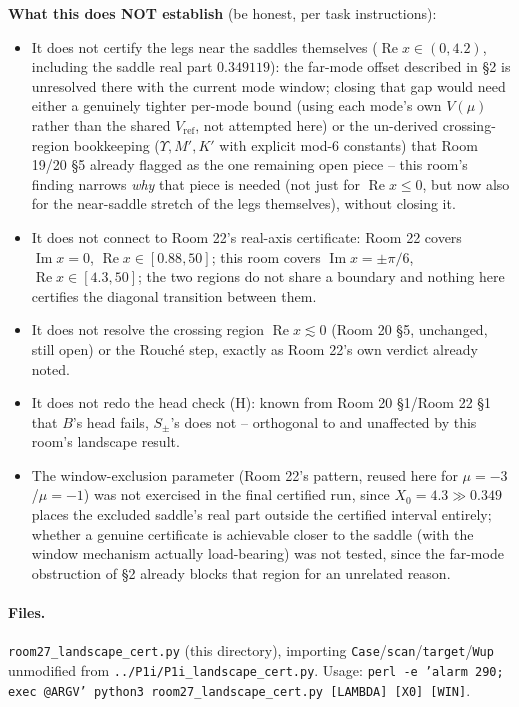 \documentclass[11pt]{article}
\begin{document}
\textbf{What this does NOT establish} (be honest, per task instructions):
\begin{itemize}
\item It does not certify the legs near the saddles themselves ($\operatorname{Re}x\in(0,4.2)$, including
the saddle real part $0.349119$): the far-mode offset described in \S2 is unresolved there with the
current mode window; closing that gap would need either a genuinely tighter per-mode bound (using each
mode's own $V(\mu)$ rather than the shared $V_{\mathrm{ref}}$, not attempted here) or the un-derived
crossing-region bookkeeping ($\Upsilon,M',K'$ with explicit mod-6 constants) that Room 19/20 \S5 already
flagged as the one remaining open piece -- this room's finding narrows \emph{why} that piece is needed
(not just for $\operatorname{Re}x\le0$, but now also for the near-saddle stretch of the legs themselves),
without closing it.
\item It does not connect to Room 22's real-axis certificate: Room 22 covers $\operatorname{Im}x=0$,
$\operatorname{Re}x\in[0.88,50]$; this room covers $\operatorname{Im}x=\pm\pi/6$,
$\operatorname{Re}x\in[4.3,50]$; the two regions do not share a boundary and nothing here certifies the
diagonal transition between them.
\item It does not resolve the crossing region $\operatorname{Re}x\lesssim0$ (Room 20 \S5, unchanged, still
open) or the Rouch\'e step, exactly as Room 22's own verdict already noted.
\item It does not redo the head check (H): known from Room 20 \S1/Room 22 \S1 that $B$'s head fails,
$S_\pm$'s does not -- orthogonal to and unaffected by this room's landscape result.
\item The window-exclusion parameter (Room 22's pattern, reused here for $\mu=-3$/$\mu=-1$) was not
exercised in the final certified run, since $X_0=4.3\gg0.349$ places the excluded saddle's real part
outside the certified interval entirely; whether a genuine certificate is achievable closer to the saddle
(with the window mechanism actually load-bearing) was not tested, since the far-mode obstruction of \S2
already blocks that region for an unrelated reason.
\end{itemize}

\paragraph{Files.} \texttt{room27\_landscape\_cert.py} (this directory), importing
\texttt{Case}/\texttt{scan}/\texttt{target}/\texttt{Wup} unmodified from \texttt{../P1i/P1i\_landscape\_cert.py}.
Usage: \texttt{perl -e 'alarm 290; exec @ARGV' python3 room27\_landscape\_cert.py [LAMBDA] [X0] [WIN]}.
\end{document}
